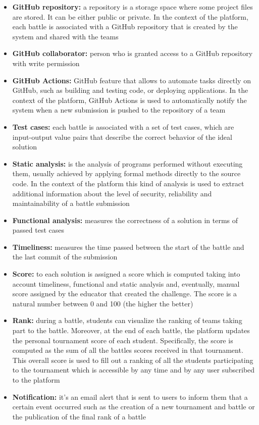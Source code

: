 \begin{itemize}
    \item {\textbf{GitHub repository:} a repository is a storage space where some project files are stored. It can be either public or private. In the context of the platform, each battle is associated with a GitHub repository that is created by the system and shared with the teams}
    \item {\textbf{GitHub collaborator:} person who is granted access to a GitHub repository with write permission}
    \item {\textbf{GitHub Actions:} GitHub feature that allows to automate tasks directly on GitHub, such as building and testing code, or deploying applications. In the context of the platform, GitHub Actions is used to automatically notify the system when a new submission is pushed to the repository of a team}
    \item {\textbf{Test cases:} each battle is associated with a set of test cases, which  are input-output value pairs that describe the correct behavior of the ideal solution}
    \item {\textbf{Static analysis:} is the analysis of programs performed without executing them, usually achieved by applying formal methods directly to the source code. In the context of the platform this kind of analysis is used to extract additional information about the level of security, reliability and maintainability of a battle submission}
    \item {\textbf{Functional analysis:} measures the correctness of a solution in terms of passed test cases}
    \item {\textbf{Timeliness:} measures the time passed between the start of the battle and the last commit of the submission}
    \item {\textbf{Score:} to each solution is assigned a score which is computed taking into account timeliness, functional and static analysis and, eventually, manual score assigned by the educator that created the challenge. The score is a natural number between 0 and 100 (the higher the better)}
    \item {\textbf{Rank:} during a battle, students can visualize the ranking of teams taking part to the battle. Moreover, at the end of each battle, the platform updates the personal tournament score of each student. Specifically, the score is computed as the sum of all the battles scores received in that tournament. This overall score is used to fill out a ranking of all the students participating to the tournament which is accessible by any time and by any user subscribed to the platform}
    \item {\textbf{Notification:} it's an  email alert that is sent to users to inform them that a certain event occurred such as the creation of a new tournament and battle or the publication of the final rank of a battle}
\end{itemize}

